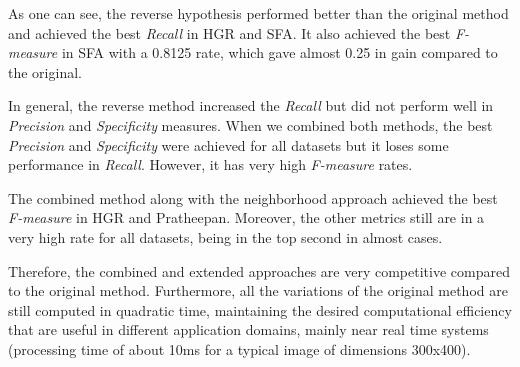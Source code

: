 As one can see, the reverse hypothesis performed better than the original method and achieved the best \textit{Recall} in HGR and SFA. It also achieved the best \textit{F-measure} in SFA with a 0.8125 rate, which gave almost 0.25 in gain compared to the original.

In general, the reverse method increased the \textit{Recall} but did not perform well in \textit{Precision} and \textit{Specificity} measures. When we combined both methods, the best \textit{Precision} and \textit{Specificity} were achieved for all datasets but it loses some performance in \textit{Recall}. However, it has very high \textit{F-measure} rates.

The combined method along with the neighborhood approach achieved the best \textit{F-measure} in HGR and Pratheepan. Moreover, the other metrics still are in a very high rate for all datasets, being in the top second in almost cases.

Therefore, the combined and extended approaches are very competitive compared to the original method. Furthermore, all the variations of the original method are still computed in quadratic time, maintaining the desired computational efficiency that are useful in different application domains, mainly near real time systems (processing time of about 10ms for a typical image of dimensions 300x400).
